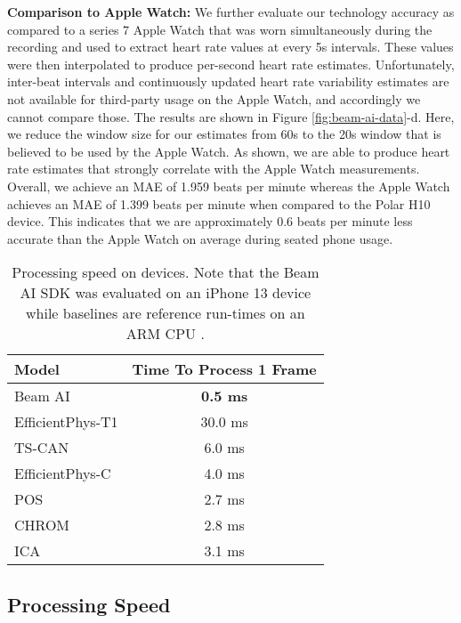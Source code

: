 \documentclass{article}
\begin{document}
\textbf{Comparison to Apple Watch:} We further evaluate our technology accuracy as compared to a series 7 Apple Watch that was worn simultaneously during the recording and used to extract heart rate values at every 5s intervals. These values were then interpolated to produce per-second heart rate estimates. Unfortunately, inter-beat intervals and continuously updated heart rate variability estimates are not available for third-party usage on the Apple Watch, and accordingly we cannot compare those. The results are shown in Figure \ref{fig:beam-ai-data}-d. Here, we reduce the window size for our estimates from 60s to the 20s window that is believed to be used by the Apple Watch. As shown, we are able to produce heart rate estimates that strongly correlate with the Apple Watch measurements. Overall, we achieve an MAE of 1.959 beats per minute whereas the Apple Watch achieves an MAE of 1.399 beats per minute when compared to the Polar H10 device. This indicates that we are approximately 0.6 beats per minute less accurate than the Apple Watch on average during seated phone usage.

\begin{table}[t]
    \centering
    \tabcolsep=1.67cm
    \begin{tabular}{lc}
        Model & Time To Process 1 Frame \\
        \midrule
        Beam AI & \textbf{0.5 ms} \\
        \midrule
        EfficientPhys-T1 \cite{EfficientPhys_Liu2021} & 30.0 ms \\
        TS-CAN \cite{TSCAN_Liu2020} & 6.0 ms \\
        EfficientPhys-C \cite{EfficientPhys_Liu2021} & 4.0 ms \\
        POS \cite{POS_Wang2016} & 2.7 ms \\
        CHROM \cite{CHROM_DeHaan2013} & 2.8 ms \\
        ICA \cite{ICA_Poh2011} & 3.1 ms \\
    \end{tabular}
    \vspace{0.05in}
    \caption{Processing speed on devices. Note that the Beam AI SDK was evaluated on an iPhone 13 device while baselines are reference run-times on an ARM CPU \cite{EfficientPhys_Liu2021, TSCAN_Liu2020}.}
    \label{tab:processing-speed}
    \vspace{-0.2in}
\end{table}

\subsection{Processing Speed}
\label{sec:processing-speed}
\end{document}
